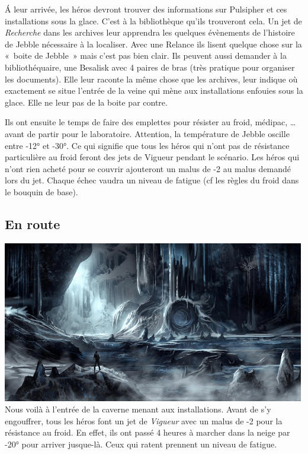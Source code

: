 \'A leur arrivée, les héros devront trouver des informations sur Pulsipher et ces installations sous la glace. C’est à la bibliothèque qu’ils trouveront cela. Un jet de \emph{Recherche} dans les archives leur apprendra les quelques évènements de l’histoire de Jebble nécessaire à la localiser. Avec une Relance ils lisent quelque chose sur la «~boite de Jebble~» mais c’est pas bien clair. Ils peuvent aussi demander à la bibliothéquaire, une Besalisk avec 4 paires de bras (très pratique pour organiser les documents). Elle leur raconte la même chose que les archives, leur indique où exactement se situe l’entrée de la veine qui mène aux installations enfouies sous la glace. Elle ne leur pas de la boite par contre.

Ils ont ensuite le temps de faire des emplettes pour résister au froid, médipac, \ldots avant de partir pour le laboratoire. Attention, la température de Jebble oscille entre -12° et -30°. Ce qui signifie que tous les héros qui n’ont pas de résistance particulière au froid feront des jets de Vigueur pendant le scénario. Les héros qui n’ont rien acheté pour se couvrir ajouteront un malus de -2 au malus demandé lors du jet. Chaque échec vaudra un niveau de fatigue (cf les règles du froid dans le bouquin de base).

\subsection{En route}
\noindent\includegraphics[width=\linewidth]{_img/dos-au-muur/jebble-cave.png}
Nous voilà à l’entrée de la caverne menant aux installations. Avant de s’y engouffrer, tous les héros font un jet de \emph{Vigueur} avec un malus de -2 pour la résistance au froid. En effet, ils ont passé 4 heures à marcher dans la neige par -20° pour arriver jusque-là. Ceux qui ratent prennent un niveau de fatigue.

